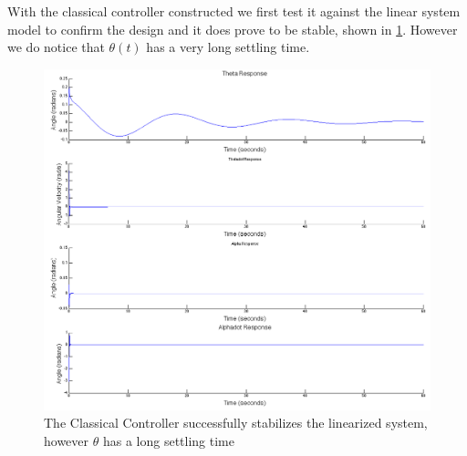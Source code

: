 \documentclass{article}
\theoremstyle{plain}
\theoremstyle{definition}
\theoremstyle{remark}
\begin{document}
With the classical controller constructed we first test it against the linear system model to confirm the design and it does prove to be stable, shown in \ref{ClassicalLinearModel}.  However we do notice that $\theta(t)$ has a very long settling time.  
\begin{figure}
\begin{center}
\includegraphics[width = 15cm]{classicalLinearModel.png}
\end{center}
\caption{The Classical Controller successfully stabilizes the linearized system, however $\theta$ has a long settling time}
\label{ClassicalLinearModel}
\end{figure}
\end{document}
